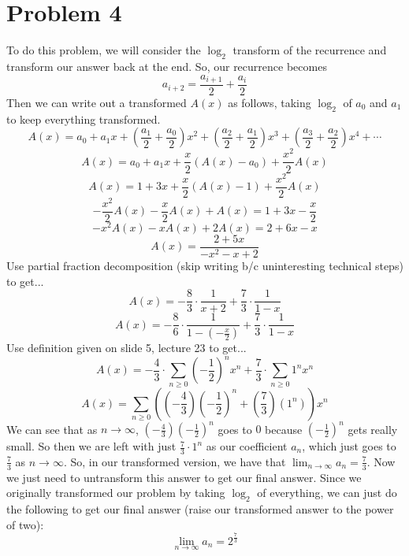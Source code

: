 \documentclass{article}
\begin{document}
\section*{Problem 4}
To do this problem, we will consider the $\log_2$ transform of the recurrence
and transform our answer back at the end. So, our recurrence becomes
\[ a_{i+2} = \frac{a_{i+1}}{2} + \frac{a_i}{2} \]
Then we can write out a transformed $A(x)$ as follows, taking $\log_2$ of
$a_0$ and $a_1$ to keep everything transformed.
\[ A(x) = a_0 + a_1x + (\frac{a_1}{2} + \frac{a_0}{2})x^2 + (\frac{a_2}{2}
    + \frac{a_1}{2})x^3 + (\frac{a_3}{2} + \frac{a_2}{2})x^4 + \cdots \]
\[ A(x) = a_0 + a_1x + \frac{x}{2}(A(x) - a_0) + \frac{x^2}{2}A(x) \]
\[ A(x) = 1 + 3x + \frac{x}{2}(A(x) - 1) + \frac{x^2}{2}A(x) \]
\[ -\frac{x^2}{2}A(x) - \frac{x}{2}A(x) + A(x) = 1 + 3x - \frac{x}{2} \]
\[ -x^2A(x) - xA(x) + 2A(x) = 2 + 6x - x \]
\[ A(x) = \frac{2 + 5x}{-x^2 - x + 2} \]
Use partial fraction decomposition (skip writing b/c uninteresting technical
steps) to get...
\[ A(x) = -\frac{8}{3} \cdot \frac{1}{x+2} + \frac{7}{3} \cdot \frac{1}{1-x} \]
\[ A(x) = -\frac{8}{6} \cdot \frac{1}{1 - (-\frac{x}{2})}
    + \frac{7}{3} \cdot \frac{1}{1-x} \]
Use definition given on slide 5, lecture 23 to get...
\[ A(x) = -\frac{4}{3} \cdot \sum_{n \geq 0} (-\frac{1}{2})^nx^n
    + \frac{7}{3} \cdot \sum_{n \geq 0} 1^nx^n \]
\[ A(x) = \sum_{n \geq 0} \left( (-\frac{4}{3})(-\frac{1}{2})^n + (\frac{7}{3})
    (1^n)\right) x^n \]
We can see that as $n \rightarrow \infty$, $(-\frac{4}{3})(-\frac{1}{2})^n$
goes to $0$ because $(-\frac{1}{2})^n$ gets really small. So then we are left
with just $\frac{7}{3} \cdot 1^n$ as our coefficient $a_n$, which just goes to
$\frac{7}{3}$ as $n \rightarrow \infty$. So, in our transformed version, we
have that $\lim_{n \rightarrow \infty} a_n = \frac{7}{3}$.
Now we just need to untransform this answer to get our final answer. Since we
originally transformed our problem by taking $\log_2$ of everything, we can
just do the following to get our final answer (raise our transformed answer
to the power of two):
\[ \lim_{n \rightarrow \infty} a_n = 2^{\frac{7}{3}} \]
\end{document}

